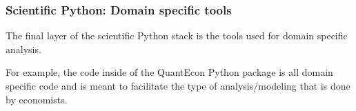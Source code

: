 \documentclass[
    xcolor={svgnames,dvipsnames},
    hyperref={colorlinks, citecolor=DeepPink4, linkcolor=DarkRed, urlcolor=DarkBlue}
]{beamer}  %
\newcommand{\1}{\mathbbm 1}
\begin{document}
\begin{frame}
    \frametitle{Scientific Python: Domain specific tools}

    The final layer of the scientific Python stack is the tools used for domain specific
    analysis.

    For example, the code inside of the QuantEcon Python package is all domain specific code and is
    meant to facilitate the type of analysis/modeling that is done by economists.

\end{frame}
\end{document}
